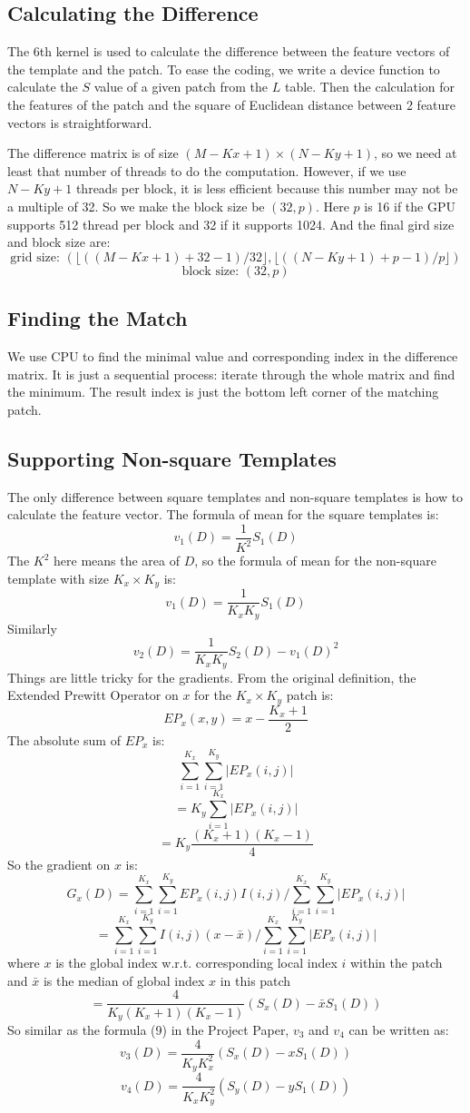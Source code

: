 \documentclass[12pt, a4paper]{article}
\begin{document}
  \subsection{Calculating the Difference}
    The 6th kernel is used to calculate the difference between the feature vectors
    of the template and the patch. To ease the coding, we write a
    device function to calculate the $S$ value of a given patch from the $L$
    table. Then the calculation for the features of the patch and the square of
    Euclidean distance between 2 feature vectors is straightforward.

    The difference matrix is of size $(M-Kx+1)\times(N-Ky+1)$, so we need at least
    that number of threads to do the computation. However, if we use $N-Ky+1$
    threads per block, it is less efficient because this number may not be a
    multiple of 32. So we make the block size be $(32, p)$. Here $p$ is 16 if
    the GPU supports 512 thread per block and 32 if it supports 1024. And the
    final gird size and block size are:
    \[\text{grid size: }(\lfloor((M-Kx+1)+32-1)/32\rfloor, \lfloor((N-Ky+1)+p-1)/p\rfloor)\]
    \[\text{block size: }(32, p)\]
  \subsection{Finding the Match}
    We use CPU to find the minimal value and corresponding index in the difference
    matrix. It is just a sequential process: iterate through the whole matrix
    and find the minimum. The result index is just the bottom left corner of the
    matching patch.

  \subsection{Supporting Non-square Templates}\label{non-square}
    The only difference between square templates and non-square templates is how
    to calculate the feature vector. The formula of mean for the square templates
    is:
    \[v_1(D)=\frac{1}{K^2}S_1(D)\]
    The $K^2$ here means the area of $D$, so the formula of mean for the non-square
    template with size $K_x\times K_y$ is:
    \[v_1(D)=\frac{1}{K_xK_y}S_1(D)\]
    Similarly
    \[v_2(D)=\frac{1}{K_xK_y}S_2(D)-v_1(D)^2\]
    Things are little tricky for the gradients. From the original definition,
    the Extended Prewitt Operator on $x$ for the $K_x\times K_y$ patch is:
    \[EP_x(x, y)=x-\frac{K_x+1}{2}\]
    The absolute sum of $EP_x$ is:
    \[\sum_{i=1}^{K_x}\sum_{i=1}^{K_y}\left|EP_x(i,j)\right|\]
    \[=K_y\sum_{i=1}^{K_x}\left|EP_x(i,j)\right|\]
    \[=K_y\frac{(K_x+1)(K_x-1)}{4}\]
    So the gradient on $x$ is:
    \[G_x(D)=\sum_{i=1}^{K_x}\sum_{i=1}^{K_y}EP_x(i,j)I(i,j)/
      \sum_{i=1}^{K_x}\sum_{i=1}^{K_y}\left|EP_x(i,j)\right|\]
    \[=\sum_{i=1}^{K_x}\sum_{i=1}^{K_y}I(i,j)(x-\bar{x})/
      \sum_{i=1}^{K_x}\sum_{i=1}^{K_y}\left|EP_x(i,j)\right|\]
    where $x$ is the global index w.r.t. corresponding local index $i$ within the
    patch and $\bar{x}$ is the median of global index $x$ in this patch
    \[=\frac{4}{K_y(K_x+1)(K_x-1)}(S_x(D)-\bar{x}S_1(D))\]
    So similar as the formula (9) in the Project Paper, $v_3$ and $v_4$ can be
    written as:
    \[v_3(D)=\frac{4}{K_yK_x^2}(S_x(D)-xS_1(D))\]
    \[v_4(D)=\frac{4}{K_xK_y^2}(S_y(D)-yS_1(D))\]
\end{document}
